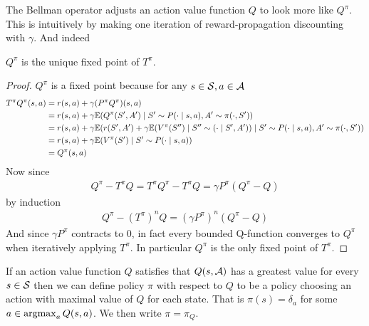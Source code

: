The Bellman operator adjusts an action value function $Q$
to look more like $Q^\pi$. This is intuitively by making one
iteration of reward-propagation discounting with $\gamma$.
And indeed 
\begin{prop}
  $Q^\pi$ is the unique fixed point of $T^\pi$. 
  \label{prop:introQfixT}
\end{prop}
\begin{proof}
  $Q^\pi$ is a fixed point because for any $s \in \mathcal{S}, a \in \mathcal{A}$
  \begin{align*}
    T^\pi Q^\pi (s, a)
    = & \; r(s, a) + \gamma (P^\pi Q^\pi)(s, a)
    \\ = & \; r(s, a) + \gamma
    \mathbb{E}(Q^\pi(S',A') \mid S' \sim P(\cdot \mid s, a), A' \sim \pi(\cdot, S'))
    \\ = & \; r(s, a) + \gamma
    \mathbb{E}( r(S', A') + \gamma \mathbb{E}(V^\pi(S'') \mid S'' \sim (\cdot \mid S', A'))
    \mid S' \sim P(\cdot \mid s, a), A' \sim \pi(\cdot, S'))
    \\ = & \; r(s,a) + \gamma \mathbb{E}(V^\pi(S') \mid S' \sim P(\cdot \mid s, a))
    \\ = & \; Q^\pi(s, a)
  \end{align*}
  Now since
  \begin{align*}
    Q^\pi - T^\pi Q = T^\pi Q^\pi - T^\pi Q = \gamma P^\pi (Q^\pi - Q)
  \end{align*}
  by induction
  \begin{align*}
    Q^\pi - (T^\pi)^n Q = (\gamma P^\pi)^n (Q^\pi - Q)
  \end{align*}
  And since $\gamma P^\pi$ contracts to 0,
  in fact every bounded Q-function converges to $Q^\pi$ when iteratively applying
  $T^\pi$. In particular $Q^\pi$ is the only fixed point of $T^\pi$.
\end{proof}

If an action value function $Q$ satisfies that
$Q(s, \mathcal{A})$ has a greatest value for every $s \in \mathcal{S}$ then we can define
 policy $\pi$ with respect to $Q$
to be a policy choosing an action with maximal value of $Q$ for each state.
That is $\pi(s) = \delta_a$ for some $a \in \operatorname*{argmax}_a Q(s,a)$.
We then write $\pi = \pi_Q$.


